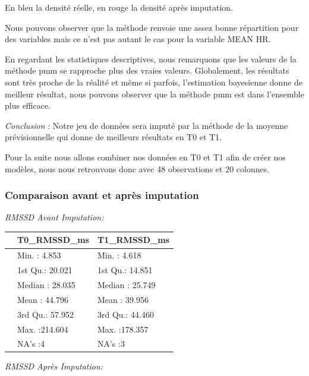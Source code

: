 \documentclass[]{article}
\begin{document}
En bleu la densité réelle, en rouge la densité après imputation.

Nous pouvons observer que la méthode renvoie une assez bonne répartition
pour des variables mais ce n'est pas autant le cas pour la variable MEAN
HR.

En regardant les statistiques descriptives, nous remarquons que les
valeurs de la méthode pmm se rapproche plus des vraies valeurs.
Globalement, les résultats sont très proche de la réalité et même si
parfois, l'estimation bayesienne donne de meilleur résultat, nous
pouvons observer que la méthode pmm est dans l'ensemble plus efficace.

\emph{Conclusion} : Notre jeu de données sera imputé par la méthode de
la moyenne prévisionnelle qui donne de meilleurs résultats en T0 et T1.

Pour la suite nous allons combiner nos données en T0 et T1 afin de créer
nos modèles, nous nous retrouvons donc avec 48 observations et 20
colonnes.

\hypertarget{comparaison-avant-et-apruxe8s-imputation}{%
\subsubsection{Comparaison avant et après
imputation}\label{comparaison-avant-et-apruxe8s-imputation}}

\emph{RMSSD Avant Imputation:}

\begin{table}[H]
\centering
\begin{tabular}{l|l|l}
\hline
  &  T0\_RMSSD\_ms &  T1\_RMSSD\_ms\\
\hline
 & Min.   :  4.853 & Min.   :  4.618\\
\hline
 & 1st Qu.: 20.021 & 1st Qu.: 14.851\\
\hline
 & Median : 28.035 & Median : 25.749\\
\hline
 & Mean   : 44.796 & Mean   : 39.956\\
\hline
 & 3rd Qu.: 57.952 & 3rd Qu.: 44.460\\
\hline
 & Max.   :214.604 & Max.   :178.357\\
\hline
 & NA's   :4 & NA's   :3\\
\hline
\end{tabular}
\end{table}

\emph{RMSSD Après Imputation:}
\end{document}
